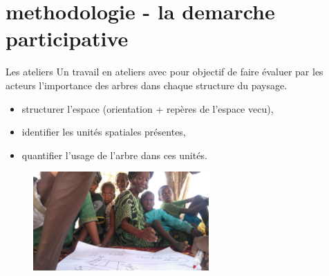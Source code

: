 \documentclass[newPxFont]{beamer}
\begin{document}
\section{methodologie - la demarche participative}
\begin{frame}[c]{Les ateliers}
\vspace{-1cm}
Un travail en ateliers avec pour objectif de faire évaluer par les acteurs l'importance des arbres dans chaque structure du paysage.
\begin{itemize}
  \item structurer l'espace (orientation + repères de l'espace vecu),
  \item identifier les unités spatiales présentes,
  \item quantifier l'usage de l'arbre dans ces unités.
\end{itemize}
\begin{figure}
	\centering
	\includegraphics[width = 0.6\textwidth,angle=180]{img/DSC_1789}
\end{figure}
\end{frame}

\end{document}
